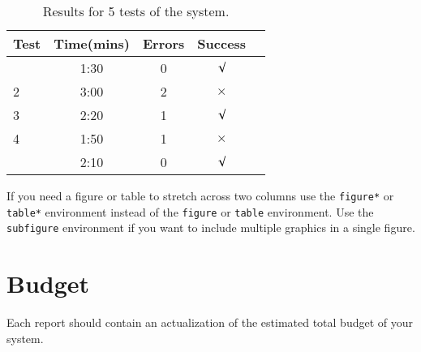 \documentclass{article}
\begin{document}
\begin{table}[h]
\vskip 3mm
\begin{center}
\begin{small}
\begin{sc}
\begin{tabular}{lcccr}
\hline
\abovespace\belowspace
Test  & Time(mins) & Errors & Success \\
\hline
\abovespace
1    & 1:30 & 0 & $\surd$ \\
2    & 3:00 & 2 & $\times$\\
3    & 2:20 & 1 & $\surd$ \\
4    & 1:50 & 1 & $\times$\\
\belowspace
5    & 2:10 & 0 & $\surd$ \\
\hline
\end{tabular}
\end{sc}
\end{small}
\caption{Results for 5 tests of the system.}
\label{tab:sample-table}
\end{center}
\vskip -3mm
\end{table}

If you need a figure or table to stretch across two columns use the \verb+figure*+ or \verb+table*+ environment instead of the \verb+figure+ or \verb+table+ environment.  Use the \verb+subfigure+ environment if you want to include multiple graphics in a single figure.

\section{Budget}
Each report should contain an actualization of the estimated total budget 
of your system.



\end{document}
